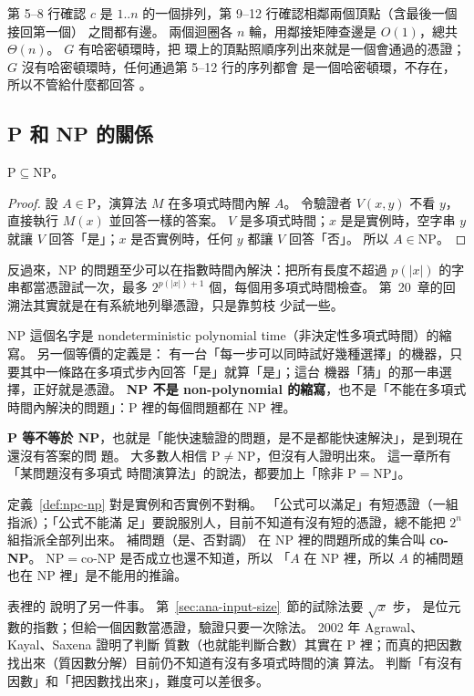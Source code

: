 第 5--8 行確認 $c$ 是 $1..n$ 的一個排列，第 9--12 行確認相鄰兩個頂點（含最後一個接回第一個）
之間都有邊。 兩個迴圈各 $n$ 輪，用鄰接矩陣查邊是 $O(1)$，總共 $\Theta(n)$。 $G$ 有哈密頓環時，把
環上的頂點照順序列出來就是一個會通過的憑證；$G$ 沒有哈密頓環時，任何通過第 5--12 行的序列都會
是一個哈密頓環，不存在，所以不管給什麼都回答 \FALSE。

\subsection{P 和 NP 的關係}

\begin{theorem}
\label{thm:npc-p-in-np}
$\mathrm{P} \subseteq \mathrm{NP}$。
\end{theorem}

\begin{proof}
設 $A \in \mathrm{P}$，演算法 $M$ 在多項式時間內解 $A$。 令驗證者 $V(x, y)$ 不看 $y$，直接執行
$M(x)$ 並回答一樣的答案。 $V$ 是多項式時間；$x$ 是是實例時，空字串 $y$ 就讓 $V$ 回答「是」；$x$
是否實例時，任何 $y$ 都讓 $V$ 回答「否」。 所以 $A \in \mathrm{NP}$。
\end{proof}

反過來，NP 的問題至少可以在指數時間內解決：把所有長度不超過 $p(|x|)$ 的字串都當憑證試一次，最多
$2^{p(|x|) + 1}$ 個，每個用多項式時間檢查。 第~20~章的回溯法其實就是在有系統地列舉憑證，只是靠剪枝
少試一些。

NP 這個名字是 nondeterministic polynomial time（非決定性多項式時間）的縮寫。 另一個等價的定義是：
有一台「每一步可以同時試好幾種選擇」的機器，只要其中一條路在多項式步內回答「是」就算「是」；這台
機器「猜」的那一串選擇，正好就是憑證。 \textbf{NP 不是 non-polynomial 的縮寫}，也不是「不能在多項式
時間內解決的問題」：P 裡的每個問題都在 NP 裡。

\textbf{P 等不等於 NP}，也就是「能快速驗證的問題，是不是都能快速解決」，是到現在還沒有答案的問
題。 大多數人相信 $\mathrm{P} \ne \mathrm{NP}$，但沒有人證明出來。 這一章所有「某問題沒有多項式
時間演算法」的說法，都要加上「除非 $\mathrm{P} = \mathrm{NP}$」。

定義~\ref{def:npc-np} 對是實例和否實例不對稱。 「公式可以滿足」有短憑證（一組指派）；「公式不能滿
足」要說服別人，目前不知道有沒有短的憑證，總不能把 $2^n$ 組指派全部列出來。 補問題（是、否對調）
在 NP 裡的問題所成的集合叫 \textbf{co-NP}。 $\mathrm{NP} = \text{co-NP}$ 是否成立也還不知道，所以
「$A$ 在 NP 裡，所以 $A$ 的補問題也在 NP 裡」是不能用的推論。

表裡的  說明了另一件事。 第~\ref{sec:ana-input-size}~節的試除法要 $\sqrt{x}$ 步，
是位元數的指數；但給一個因數當憑證，驗證只要一次除法。 2002 年 Agrawal、Kayal、Saxena 證明了判斷
質數（也就能判斷合數）其實在 P 裡；而真的把因數找出來（質因數分解）目前仍不知道有沒有多項式時間的演
算法。 判斷「有沒有因數」和「把因數找出來」，難度可以差很多。

